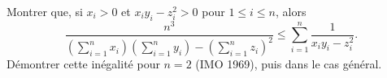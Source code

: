 Montrer que, si $x_i > 0$ et $x_iy_i - z_i^2 > 0$ pour $1 \leq i \leq n$, alors
\[ \frac{n^3}{\left(\sum_{i=1}^n x_i\right)\left(\sum_{i=1}^n y_i\right) - \left(\sum_{i=1}^n z_i\right)^2} \leq \sum_{i=1}^n \frac{1}{x_iy_i - z_i^2}. \]
Démontrer cette inégalité pour $n = 2$ (IMO 1969), puis dans le cas général.
